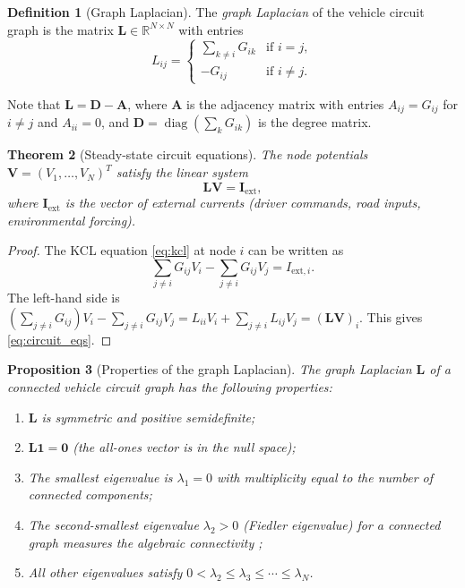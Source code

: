 \documentclass[twocolumn,10pt,a4paper]{article}
\newtheorem{theorem}{Theorem}[section]
\newtheorem{proposition}[theorem]{Proposition}
\theoremstyle{definition}
\newtheorem{definition}[theorem]{Definition}
\theoremstyle{remark}
\newcommand{\R}{\mathbb{R}}
\newcommand{\vect}[1]{\boldsymbol{#1}}
\newcommand{\mat}[1]{\mathbf{#1}}
\DeclareMathOperator{\diag}{diag}
\begin{document}
\begin{definition}[Graph Laplacian]\label{def:laplacian}
The \emph{graph Laplacian} of the vehicle circuit graph is the matrix $\mat{L} \in \R^{N \times N}$ with entries
\begin{equation}\label{eq:laplacian}
L_{ij} = \begin{cases}
\sum_{k \neq i} G_{ik} & \text{if } i = j, \\
-G_{ij} & \text{if } i \neq j.
\end{cases}
\end{equation}
\end{definition}

Note that $\mat{L} = \mat{D} - \mat{A}$, where $\mat{A}$ is the adjacency matrix with entries $A_{ij} = G_{ij}$ for $i \neq j$ and $A_{ii} = 0$, and $\mat{D} = \diag(\sum_k G_{ik})$ is the degree matrix.

\begin{theorem}[Steady-state circuit equations]\label{thm:circuit_eqs}
The node potentials $\vect{V} = (V_1, \ldots, V_N)^T$ satisfy the linear system
\begin{equation}\label{eq:circuit_eqs}
\mat{L} \vect{V} = \vect{I}_{\mathrm{ext}},
\end{equation}
where $\vect{I}_{\mathrm{ext}}$ is the vector of external currents (driver commands, road inputs, environmental forcing).
\end{theorem}

\begin{proof}
The KCL equation \eqref{eq:kcl} at node $i$ can be written as
\begin{equation}
\sum_{j \neq i} G_{ij} V_i - \sum_{j \neq i} G_{ij} V_j = I_{\mathrm{ext},i}.
\end{equation}
The left-hand side is $\left(\sum_{j \neq i} G_{ij}\right) V_i - \sum_{j \neq i} G_{ij} V_j = L_{ii} V_i + \sum_{j \neq i} L_{ij} V_j = (\mat{L}\vect{V})_i$. This gives \eqref{eq:circuit_eqs}.
\end{proof}

\begin{proposition}[Properties of the graph Laplacian]\label{prop:laplacian_props}
The graph Laplacian $\mat{L}$ of a connected vehicle circuit graph has the following properties:
\begin{enumerate}[label=(\roman*)]
\item $\mat{L}$ is symmetric and positive semidefinite;
\item $\mat{L}\vect{1} = \vect{0}$ (the all-ones vector is in the null space);
\item The smallest eigenvalue is $\lambda_1 = 0$ with multiplicity equal to the number of connected components;
\item The second-smallest eigenvalue $\lambda_2 > 0$ (Fiedler eigenvalue) for a connected graph measures the algebraic connectivity \citep{Chung1997};
\item All other eigenvalues satisfy $0 < \lambda_2 \leq \lambda_3 \leq \cdots \leq \lambda_N$.
\end{enumerate}
\end{proposition}
\end{document}
